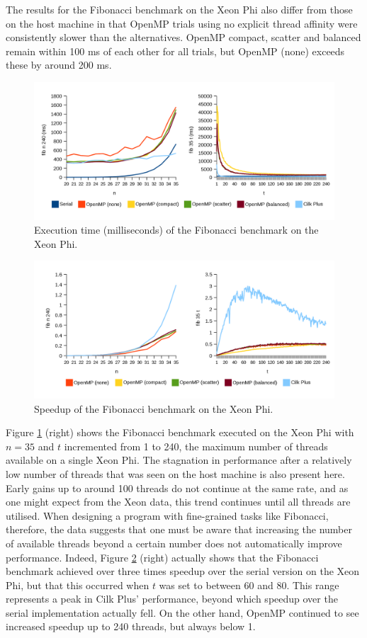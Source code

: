 \documentclass{report}
\begin{document}
The results for the Fibonacci benchmark on the Xeon Phi also differ from those on the host machine in that OpenMP trials using no explicit thread affinity were consistently slower than the alternatives. OpenMP compact, scatter and balanced remain within 100 ms of each other for all trials, but OpenMP (none) exceeds these by around 200 ms.
\noindent
\begin{figure}[t!]
	\includegraphics[width=\linewidth]{../../charts/mic/fib_time}
	\caption{Execution time (milliseconds) of the Fibonacci benchmark on the Xeon Phi.}
	\label{Fig:fibmictime}
\end{figure}
\noindent
\begin{figure}[t!]
	\includegraphics[width=\linewidth]{../../charts/mic/fib_speedup}
	\caption{Speedup of the Fibonacci benchmark on the Xeon Phi.}
	\label{Fig:fibmicspeedup}
\end{figure}

Figure \ref{Fig:fibmictime} (right) shows the Fibonacci benchmark executed on the Xeon Phi with \(n=35\) and \(t\) incremented from 1 to 240, the maximum number of threads available on a single Xeon Phi. The stagnation in performance after a relatively low number of threads that was seen on the host machine is also present here. Early gains up to around 100 threads do not continue at the same rate, and as one might expect from the Xeon data, this trend continues until all threads are utilised. When designing a program with fine-grained tasks like Fibonacci, therefore, the data suggests that one must be aware that increasing the number of available threads beyond a certain number does not automatically improve performance. Indeed, Figure \ref{Fig:fibmicspeedup} (right) actually shows that the Fibonacci benchmark achieved over three times speedup over the serial version on the Xeon Phi, but that this occurred when \(t\) was set to between 60 and 80. This range represents a peak in Cilk Plus' performance, beyond which speedup over the serial implementation actually fell. On the other hand, OpenMP continued to see increased speedup up to 240 threads, but always below 1.
\end{document}

